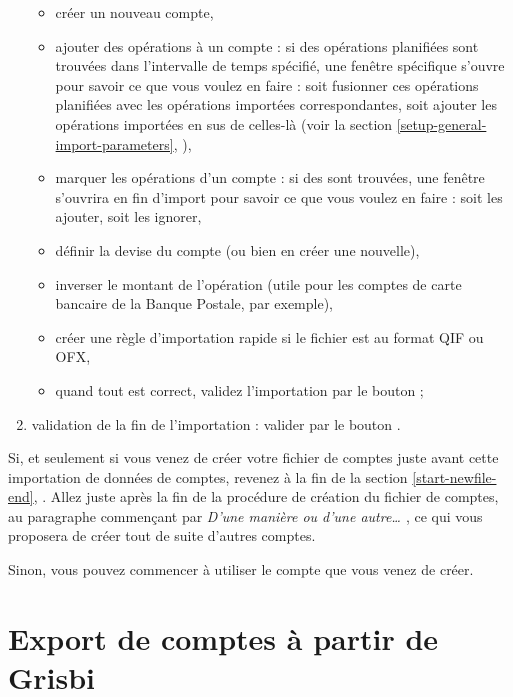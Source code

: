 \begin{enumerate}
		\begin{itemize}
			\item créer un nouveau compte,
			\item ajouter des opérations à un compte : si des opérations planifiées sont trouvées dans l'intervalle de temps spécifié, une fenêtre spécifique s'ouvre pour savoir ce que vous voulez en faire : soit fusionner ces opérations planifiées avec les opérations importées correspondantes, soit ajouter les opérations importées en sus de celles-là (voir la section \vref{setup-general-import-parameters}, ),
			\item marquer les opérations d'un compte : si des  sont trouvées, une fenêtre s'ouvrira en fin d'import pour savoir ce que vous voulez en faire : soit les ajouter, soit les ignorer,
			\item définir la devise du compte (ou bien en créer une nouvelle),
			\item   inverser le montant de l'opération (utile pour les comptes de carte bancaire de la Banque Postale, par exemple),
			\item créer une règle d'importation rapide si le fichier est au format QIF ou OFX,
			\item quand tout est correct, validez l'importation par le bouton  ;
		\end{itemize}
	
	 \item validation de la fin de l'importation : valider par le bouton .
\end{enumerate}

Si, et seulement si vous venez de créer votre fichier de comptes juste avant cette importation de données de comptes, revenez à la fin de la section \vref{start-newfile-end}, . Allez juste après la fin de la procédure de création du fichier de comptes, au paragraphe commençant par \emph{D'une manière ou d'une autre\ldots{ }}, ce qui vous proposera de créer tout de suite d'autres comptes.

Sinon, vous pouvez commencer à utiliser le compte que vous venez de créer.


\section{Export de comptes à partir de Grisbi\label{move-export}}


